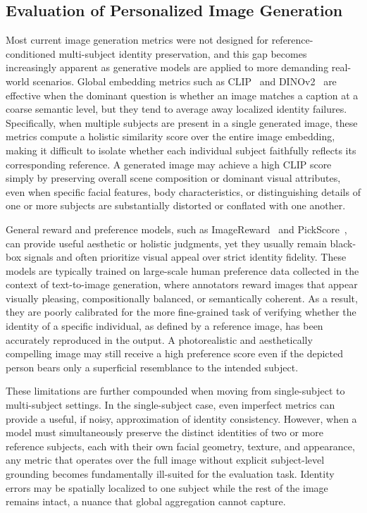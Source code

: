 \documentclass{article}
\begin{document}
\subsection{Evaluation of Personalized Image Generation}
Most current image generation metrics were not designed for reference-conditioned multi-subject identity preservation, and this gap becomes increasingly apparent as generative models are applied to more demanding real-world scenarios. Global embedding metrics such as CLIP~\cite{radford2021learning} and DINOv2~\cite{oquab2023dinov2} are effective when the dominant question is whether an image matches a caption at a coarse semantic level, but they tend to average away localized identity failures. Specifically, when multiple subjects are present in a single generated image, these metrics compute a holistic similarity score over the entire image embedding, making it difficult to isolate whether each individual subject faithfully reflects its corresponding reference. A generated image may achieve a high CLIP score simply by preserving overall scene composition or dominant visual attributes, even when specific facial features, body characteristics, or distinguishing details of one or more subjects are substantially distorted or conflated with one another.

General reward and preference models, such as ImageReward~\cite{xu2023imagereward} and PickScore~\cite{kirstain2023pick}, can provide useful aesthetic or holistic judgments, yet they usually remain black-box signals and often prioritize visual appeal over strict identity fidelity. These models are typically trained on large-scale human preference data collected in the context of text-to-image generation, where annotators reward images that appear visually pleasing, compositionally balanced, or semantically coherent. As a result, they are poorly calibrated for the more fine-grained task of verifying whether the identity of a specific individual, as defined by a reference image, has been accurately reproduced in the output. A photorealistic and aesthetically compelling image may still receive a high preference score even if the depicted person bears only a superficial resemblance to the intended subject.

These limitations are further compounded when moving from single-subject to multi-subject settings. In the single-subject case, even imperfect metrics can provide a useful, if noisy, approximation of identity consistency. However, when a model must simultaneously preserve the distinct identities of two or more reference subjects, each with their own facial geometry, texture, and appearance, any metric that operates over the full image without explicit subject-level grounding becomes fundamentally ill-suited for the evaluation task. Identity errors may be spatially localized to one subject while the rest of the image remains intact, a nuance that global aggregation cannot capture.
\end{document}

